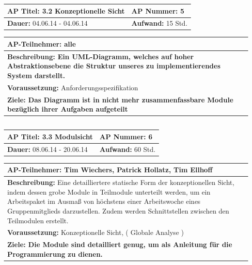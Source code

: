 \documentclass[fontsize=12pt,paper=a4,twoside]{scrartcl}
\begin{document}
\begin{tabular}{|p{7.43cm}|p{7.43cm}|}
\hline
\textbf{AP Titel: }3.2 Konzeptionelle Sicht & \textbf{AP Nummer: }5\\ 
\hline
\textbf{Dauer: }04.06.14 - 04.06.14& \textbf{Aufwand: }15 Std.\\
\hline
\end{tabular}
\begin{tabular}{|p{15.3cm}|}
\hline
\textbf{AP-Teilnehmer: }alle\\
\hline
\textbf{Beschreibung: Ein UML-Diagramm, welches auf hoher Abstraktionsebene
die Struktur unseres zu implementierendes System darstellt.}\\
\hline
\textbf{Voraussetzung: }Anforderungsspezifikation\\
\hline 
\textbf{Ziele: Das Diagramm ist in nicht mehr zusammenfassbare Module bezüglich ihrer
Aufgaben aufgeteilt}\\
\hline 
\end{tabular}
\begin{verbatim}

\end{verbatim}

\begin{tabular}{|p{7.43cm}|p{7.43cm}|}
\hline
\textbf{AP Titel: }3.3 Modulsicht & \textbf{AP Nummer: }6\\ 
\hline
\textbf{Dauer: }08.06.14 - 20.06.14& \textbf{Aufwand: }60 Std.\\
\hline
\end{tabular}
\begin{tabular}{|p{15.3cm}|}
\hline
\textbf{AP-Teilnehmer: }Tim Wiechers, Patrick Hollatz, Tim Ellhoff\\
\hline
\textbf{Beschreibung: }Eine detailliertere statische Form der konzeptionellen Sicht, indem dessen grobe Module in Teilmodule unterteilt werden, um ein Arbeitspaket im Ausmaß von höchstens einer Arbeitswoche eines Gruppenmitglieds darzustellen. Zudem werden Schnittstellen
zwischen den Teilmodulen erstellt. \\
\hline
\textbf{Voraussetzung: }Konzeptionelle Sicht, ( Globale Analyse )\\
\hline 
\textbf{Ziele: Die Module sind detailliert genug, um als Anleitung für die Programmierung zu dienen.}\\
\hline 
\end{tabular}
\begin{verbatim}

\end{verbatim}
\end{document}
